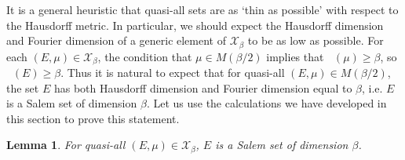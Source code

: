 \documentclass[dvipsnames,letterpaper,12pt]{article}
\numberwithin{equation}{section}
\DeclareMathOperator{\fordim}{\dim_{\mathbf{F}}}
\newtheorem{lemma}[theorem]{Lemma}
\numberwithin{theorem}{section}
\begin{document}
It is a general heuristic that quasi-all sets are as `thin as possible' with respect to the Hausdorff metric. In particular, we should expect the Hausdorff dimension and Fourier dimension of a generic element of $\mathcal{X}_\beta$ to be as low as possible. For each $(E,\mu) \in \mathcal{X}_\beta$, the condition that $\mu \in M(\beta/2)$ implies that $\fordim(\mu) \geq \beta$, so $\fordim(E) \geq \beta$. Thus it is natural to expect that for quasi-all $(E,\mu) \in M(\beta/2)$, the set $E$ has both Hausdorff dimension and Fourier dimension equal to $\beta$, i.e. $E$ is a Salem set of dimension $\beta$. Let us use the calculations we have developed in this section to prove this statement.

\begin{lemma} \label{lemmaoiajdoijwdowaj}
    For quasi-all $(E,\mu) \in \mathcal{X}_\beta$, $E$ is a Salem set of dimension $\beta$.
\end{lemma}
\end{document}
